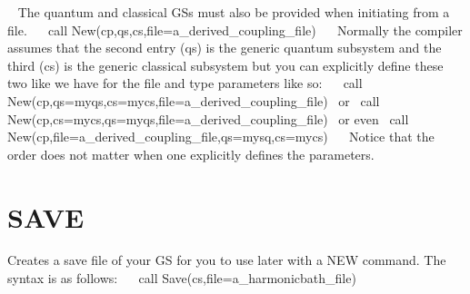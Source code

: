 ~\newline
The quantum and classical G\+Ss must also be provided when initiating from a file.~\newline
~\newline
 call New(cp,qs,cs,file=\textquotesingle{}a\+\_\+derived\+\_\+coupling\+\_\+file\textquotesingle{})~\newline
~\newline
Normally the compiler assumes that the second entry (qs) is the generic quantum subsystem and the third (cs) is the generic classical subsystem but you can explicitly define these two like we have for the \textquotesingle{}file\textquotesingle{} and \textquotesingle{}type\textquotesingle{} parameters like so\+:~\newline
~\newline
 call New(cp,qs=myqs,cs=mycs,file=\textquotesingle{}a\+\_\+derived\+\_\+coupling\+\_\+file\textquotesingle{})~\newline
or~\newline
 call New(cp,cs=mycs,qs=myqs,file=\textquotesingle{}a\+\_\+derived\+\_\+coupling\+\_\+file\textquotesingle{})~\newline
or even~\newline
 call New(cp,file=\textquotesingle{}a\+\_\+derived\+\_\+coupling\+\_\+file\textquotesingle{},qs=mysq,cs=mycs)~\newline
~\newline
Notice that the order does not matter when one explicitly defines the parameters.~\newline
\hypertarget{_interface_SAVE}{}\section{S\+A\+VE}\label{_interface_SAVE}
Creates a save file of your GS for you to use later with a N\+EW command. The syntax is as follows\+:~\newline
~\newline
 call Save(cs,file=\textquotesingle{}a\+\_\+harmonicbath\+\_\+file\textquotesingle{})~\newline
~\newline
